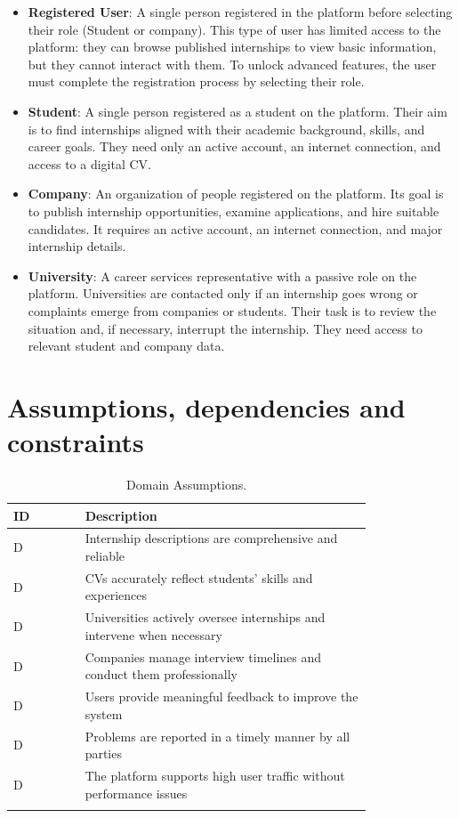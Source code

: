 \begin{itemize}
    \item \textbf{Registered User}: A single person registered in the platform before selecting their role (Student or company). This type of user has limited access to the platform: they can browse published internships to view basic information, but they cannot interact with them. To unlock advanced features, the user must complete the registration process by selecting their role.
    \item \textbf{Student}: A single person registered as a student on the platform. Their aim is to find internships aligned with their academic background, skills, and career goals. They need only an active account, an internet connection, and access to a digital CV.
    \item \textbf{Company}: An organization of people registered on the platform. Its goal is to publish internship opportunities, examine applications, and hire suitable candidates. It requires an active account, an internet connection, and major internship details.
    \item \textbf{University}: A career services representative with a passive role on the platform. Universities are contacted only if an internship goes wrong or complaints emerge from companies or students. Their task is to review the situation and, if necessary, interrupt the internship. They need access to relevant student and company data.
\end{itemize}

\section{Assumptions, dependencies and constraints}
\label{sec:assumptions_dependencies_and_constraints}%
\setcounter{da}{1}
\newcommand{\cda}{D\arabic{da}\stepcounter{da}} 
\begin{center}
    \renewcommand{\arraystretch}{2}
    \begin{longtable}{ l p{0.8\linewidth} } 
        \hline
        \textbf{ID} & \textbf{Description} \\ 
        \hline
        \cda & Internship descriptions are comprehensive and reliable \\ \hline
        \cda & CVs accurately reflect students' skills and experiences \\ \hline
        \cda & Universities actively oversee internships and intervene when necessary \\ \hline
        \cda & Companies manage interview timelines and conduct them professionally \\ \hline
        \cda & Users provide meaningful feedback to improve the system \\ \hline
        \cda & Problems are reported in a timely manner by all parties \\ \hline
        \cda & The platform supports high user traffic without performance issues \\ \hline
        \caption{Domain Assumptions.}
        \label{tab:worldph_tab}%
    \end{longtable}
\end{center}

